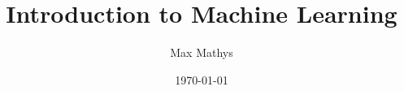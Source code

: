 \documentclass[11pt]{article}
\begin{document}
\author{Max Mathys}
\title{Introduction to Machine Learning}

\date{\today}

\setcounter{tocdepth}{2}

\setcounter{page}{1}





\end{document}
